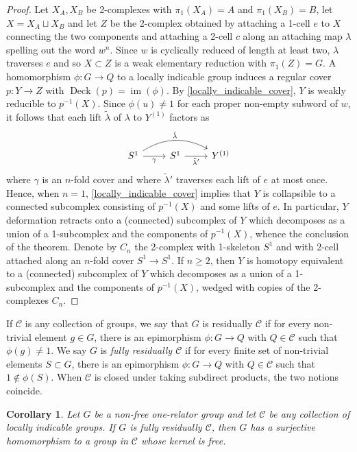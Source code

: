 \documentclass{amsart}
\newtheorem{corollary}[theorem]{Corollary}
\theoremstyle{definition}
\DeclareMathOperator{\deck}{Deck}
\DeclareMathOperator{\Ima}{im}
\begin{document}
\begin{proof}
Let $X_A, X_B$ be 2-complexes with $\pi_1(X_A) = A$ and $\pi_1(X_B) = B$, let $X = X_A\sqcup X_B$ and let $Z$ be the 2-complex obtained by attaching a 1-cell $e$ to $X$ connecting the two components and attaching a 2-cell $c$ along an attaching map $\lambda$ spelling out the word $w^n$. Since $w$ is cyclically reduced of length at least two, $\lambda$ traverses $e$ and so $X\subset Z$ is a weak elementary reduction with $\pi_1(Z) = G$. A homomorphism $\phi\colon G\to Q$ to a locally indicable group induces a regular cover $p\colon Y\to Z$ with $\deck(p) = \Ima(\phi)$. By \cref{locally_indicable_cover}, $Y$ is weakly reducible to $p^{-1}(X)$. Since $\phi(u)\neq 1$ for each proper non-empty subword of $w$, it follows that each lift $\tilde{\lambda}$ of $\lambda$ to $Y^{(1)}$ factors as
\[
\begin{tikzcd}
S^1 \arrow[r, "\gamma"'] \arrow[rr, "\tilde{\lambda}", bend left] & S^1 \arrow[r, "\tilde{\lambda}'"'] & Y^{(1)}
\end{tikzcd}
\]
where $\gamma$ is an $n$-fold cover and where $\tilde{\lambda}'$ traverses each lift of $e$ at most once. Hence, when $n = 1$, \cref{locally_indicable_cover} implies that $Y$ is collapsible to a connected subcomplex consisting of $p^{-1}(X)$ and some lifts of $e$. In particular, $Y$ deformation retracts onto a (connected) subcomplex of $Y$ which decomposes as a union of a 1-subcomplex and the components of $p^{-1}(X)$, whence the conclusion of the theorem. Denote by $C_n$ the 2-complex with 1-skeleton $S^1$ and with 2-cell attached along an $n$-fold cover $S^1\to S^1$. If $n\geqslant 2$, then $Y$ is homotopy equivalent to a (connected) subcomplex of $Y$ which decomposes as a union of a 1-subcomplex and the components of $p^{-1}(X)$, wedged with copies of the 2-complexes $C_n$.
\end{proof}


If $\mathcal{C}$ is any collection of groups, we say that $G$ is residually $\mathcal{C}$ if for every non-trivial element $g\in G$, there is an epimorphism $\phi\colon G\to Q$ with $Q\in \mathcal{C}$ such that $\phi(g) \neq 1$. We say $G$ is \emph{fully residually $\mathcal{C}$} if for every finite set of non-trivial elements $S\subset G$, there is an epimorphism $\phi\colon G\to Q$ with $Q\in \mathcal{C}$ such that $1\notin \phi(S)$. When $\mathcal{C}$ is closed under taking subdirect products, the two notions coincide.


\begin{corollary}
\label{freeby}
Let $G$ be a non-free one-relator group and let $\mathcal{C}$ be any collection of locally indicable groups. If $G$ is fully residually $\mathcal{C}$, then $G$ has a surjective homomorphism to a group in $\mathcal{C}$ whose kernel is free.
\end{corollary}
\end{document}
